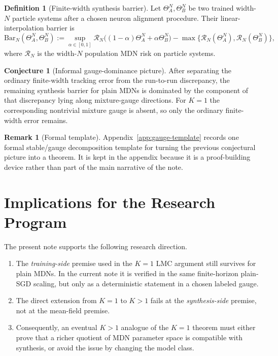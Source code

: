 \documentclass[11pt]{article}
\theoremstyle{definition}
\newtheorem{definition}[theorem]{Definition}
\newtheorem{remark}[theorem]{Remark}
\newtheorem{conjecture}[theorem]{Conjecture}
\newcommand{\mc}[1]{\mathcal{#1}}
\begin{document}
\begin{definition}[Finite-width synthesis barrier]
\label{def:barrier}
Let $\Theta_A^N,\Theta_B^N$ be two trained width-$N$ particle systems after a
chosen neuron alignment procedure. Their linear-interpolation barrier is
\[
  \mathrm{Bar}_N(\Theta_A^N,\Theta_B^N)
  :=
  \sup_{\alpha\in[0,1]}
  \mc{R}_N\big((1-\alpha)\Theta_A^N+\alpha \Theta_B^N\big)
  -
  \max\{\mc{R}_N(\Theta_A^N),\mc{R}_N(\Theta_B^N)\},
\]
where $\mc{R}_N$ is the width-$N$ population MDN risk on particle systems.
\end{definition}

\begin{conjecture}[Informal gauge-dominance picture]
After separating the ordinary finite-width tracking error from the
run-to-run discrepancy, the remaining synthesis barrier for plain MDNs is
dominated by the component of that discrepancy lying along mixture-gauge
directions. For $K=1$ the corresponding nontrivial mixture gauge is absent, so
only the ordinary finite-width error remains.
\end{conjecture}

\begin{remark}[Formal template]
Appendix~\ref{app:gauge-template} records one formal stable/gauge decomposition
template for turning the previous conjectural picture into a theorem. It is
kept in the appendix because it is a proof-building device rather than part of
the main narrative of the note.
\end{remark}

\section{Implications for the Research Program}

The present note supports the following research direction.

\begin{enumerate}[label=(\roman*)]
  \item The \emph{training-side} premise used in the $K=1$ LMC argument still
  survives for plain MDNs. In the current note it is verified in the same
  finite-horizon plain-SGD scaling, but only as a deterministic statement
  in a chosen labeled gauge.
  \item The direct extension from $K=1$ to $K>1$ fails at the
  \emph{synthesis-side} premise, not at the mean-field premise.
  \item Consequently, an eventual $K>1$ analogue of the $K=1$ theorem must
  either prove that a richer quotient of MDN parameter space is compatible with
  synthesis, or avoid the issue by changing the model class.
\end{enumerate}
\end{document}
